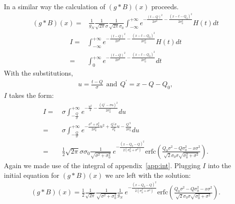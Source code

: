 \documentclass[preprint,12pt]{elsarticle}
\begin{document}
In a similar way the calculation of  $(g*B)(x)$ proceeds. 
\begin{align}
(g*B)(x) = & \frac{1 }{g_N}  \frac{1 }{\sqrt{2\pi}\sigma} \frac{1 }{\sqrt{2\pi}\sigma_0} \int^{+\infty}_{ -\infty  }  e^{-\frac{(t-Q)^2}{2\sigma^2} - \frac{(x-t-Q_0)^2}{2\sigma_0^2}} H(t) dt
\end{align}
\begin{align}
I = & \int^{+\infty}_{ -\infty  }  e^{-\frac{(t-Q)^2}{2\sigma^2} - \frac{(x-t-Q_0)^2}{2\sigma_0^2}} H(t) dt \nonumber \\
  = & \int^{+\infty}_{ 0  }  e^{-\frac{(t-Q)^2}{2\sigma^2} - \frac{(x-t-Q_0)^2}{2\sigma_0^2}} dt
\end{align}
With the substitutions,
\begin{align}
u = \frac{t-Q}{\sigma} \ \  \text{and}\  \ Q^\prime = x - Q - Q_0,
\end{align}
$I$ takes the form:
\begin{align}
I = \ & \sigma \int^{+\infty}_{ -\frac{Q}{\sigma}  }  e^{-\frac{u^2}{2} - \frac{(Q^\prime-\sigma u )^2}{2\sigma_0^2}} du \nonumber \\
  = \ & \sigma \int^{+\infty}_{ -\frac{Q}{\sigma}  } e^{-\frac{\sigma^2+\sigma_0^2}{2\sigma_0^2 }u^2 + \frac{Q^\prime\sigma}{\sigma_0^2}u - \frac{Q^{\prime 2}}{2\sigma_0^2}  } du \nonumber \\
  = \ &  \frac{1}{2} \sqrt{2\pi} \sigma \sigma_0 \frac{1}{\sqrt{\sigma^2 +\sigma_0^2}} \ e^{ -\frac{(x-Q_0-Q)^2}{2( \sigma_0^2 + \sigma^2 )}} 
  \text{erfc} 
  \left(    \frac{ Q_0\sigma^2 -Q\sigma_0^2 -x \sigma^2  }{\sqrt{2} \sigma_0\sigma\sqrt{\sigma_0^2 + \sigma^2} }         \right). 
\end{align}
Again we made use of the integral of appendix~\ref{app:int}. 
Plugging $I$ into the initial equation for $(g*B)(x)$ we are left with the solution: 
\begin{align}
(g*B)(x) = \frac{1}{2} \frac{1}{\sqrt{2\pi}} \frac{1}{\sqrt{\sigma^2 +\sigma_0^2}}  \frac{1}{g_N} \ e^{ -\frac{(x-Q_0-Q)^2}{2( \sigma_0^2 + \sigma^2 )}} 
\text{erfc} 
  \left(    \frac{ Q_0\sigma^2 -Q\sigma_0^2 -x \sigma^2  }{\sqrt{2} \sigma_0\sigma\sqrt{\sigma_0^2 + \sigma^2} }         \right). 
\end{align}
\end{document}
